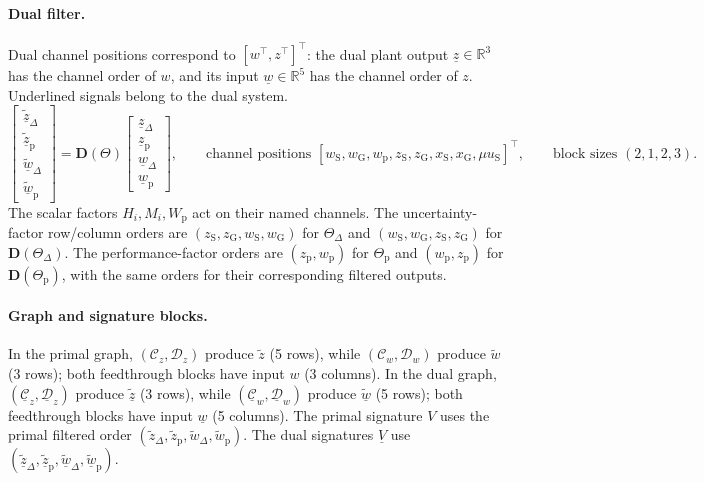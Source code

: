 \documentclass{article}
\begin{document}
\paragraph{Dual filter.} Dual channel positions correspond to $[w^\top,z^\top]^\top$: the dual plant output $\underline z\in\mathbb R^3$ has the channel order of $w$, and its input $\underline w\in\mathbb R^{5}$ has the channel order of $z$. Underlined signals belong to the dual system.
\[\begin{bmatrix}\widetilde{\underline z}_\Delta\\\widetilde{\underline z}_{\mathrm p}\\\widetilde{\underline w}_\Delta\\\widetilde{\underline w}_{\mathrm p}\end{bmatrix}=\mathbf D(\Theta)\begin{bmatrix}\underline z_\Delta\\\underline z_{\mathrm p}\\\underline w_\Delta\\\underline w_{\mathrm p}\end{bmatrix},\qquad\text{channel positions }[w_{\mathrm S},w_{\mathrm G},w_{\mathrm p},z_{\mathrm S},z_{\mathrm G},x_{\mathrm S},x_{\mathrm G},\mu u_{\mathrm S}]^\top,\qquad\text{block sizes }(2,1,2,3).\]
The scalar factors $H_i,M_i,W_{\mathrm p}$ act on their named channels. The uncertainty-factor row/column orders are $(z_{\mathrm S},z_{\mathrm G},w_{\mathrm S},w_{\mathrm G})$ for $\Theta_\Delta$ and $(w_{\mathrm S},w_{\mathrm G},z_{\mathrm S},z_{\mathrm G})$ for $\mathbf D(\Theta_\Delta)$. The performance-factor orders are $(z_{\mathrm p},w_{\mathrm p})$ for $\Theta_{\mathrm p}$ and $(w_{\mathrm p},z_{\mathrm p})$ for $\mathbf D(\Theta_{\mathrm p})$, with the same orders for their corresponding filtered outputs.
\paragraph{Graph and signature blocks.} In the primal graph, $(\mathcal C_z,\mathcal D_z)$ produce $\widetilde z$ (5 rows), while $(\mathcal C_w,\mathcal D_w)$ produce $\widetilde w$ (3 rows); both feedthrough blocks have input $w$ (3 columns). In the dual graph, $(\underline{\mathcal C}_z,\underline{\mathcal D}_z)$ produce $\widetilde{\underline z}$ (3 rows), while $(\underline{\mathcal C}_w,\underline{\mathcal D}_w)$ produce $\widetilde{\underline w}$ (5 rows); both feedthrough blocks have input $\underline w$ (5 columns).
The primal signature $V$ uses the primal filtered order $(\widetilde z_\Delta,\widetilde z_{\mathrm p},\widetilde w_\Delta,\widetilde w_{\mathrm p})$. The dual signatures $\underline V$ use $(\widetilde{\underline z}_\Delta,\widetilde{\underline z}_{\mathrm p},\widetilde{\underline w}_\Delta,\widetilde{\underline w}_{\mathrm p})$.
\end{document}
